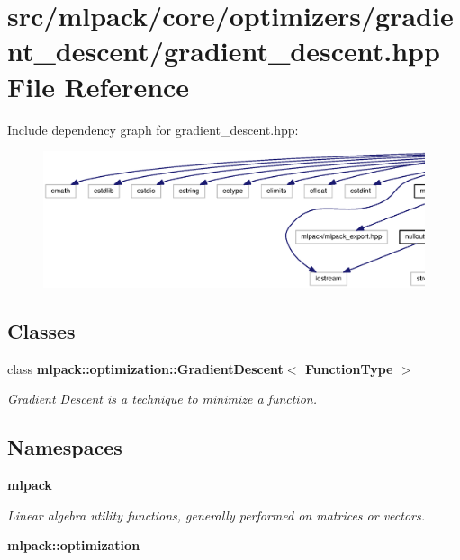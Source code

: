 \section{src/mlpack/core/optimizers/gradient\+\_\+descent/gradient\+\_\+descent.hpp File Reference}
\label{gradient__descent_8hpp}
Include dependency graph for gradient\+\_\+descent.\+hpp\+:
\nopagebreak
\begin{figure}[H]
\begin{center}
\leavevmode
\includegraphics[width=350pt]{gradient__descent_8hpp__incl}
\end{center}
\end{figure}
\subsection*{Classes}
\begin{DoxyCompactItemize}
\item 
class {\bf mlpack\+::optimization\+::\+Gradient\+Descent$<$ Function\+Type $>$}
\begin{DoxyCompactList}\small\item\em Gradient Descent is a technique to minimize a function. \end{DoxyCompactList}\end{DoxyCompactItemize}
\subsection*{Namespaces}
\begin{DoxyCompactItemize}
\item 
 {\bf mlpack}
\begin{DoxyCompactList}\small\item\em Linear algebra utility functions, generally performed on matrices or vectors. \end{DoxyCompactList}\item 
 {\bf mlpack\+::optimization}
\end{DoxyCompactItemize}


